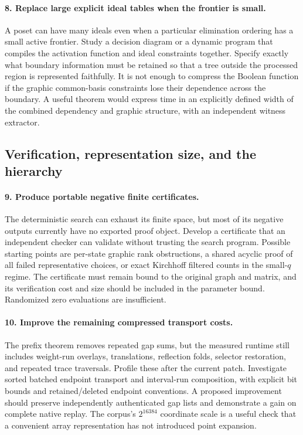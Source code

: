 \paragraph{8. Replace large explicit ideal tables when the frontier is small.}
A poset can have many ideals even when a particular elimination ordering
has a small active frontier.  Study a decision diagram or a dynamic program
that compiles the activation function and ideal constraints together.
Specify exactly what boundary information must be retained so that a tree
outside the processed region is represented faithfully.  It is not enough
to compress the Boolean function if the graphic common-basis constraints
lose their dependence across the boundary.  A useful theorem would express
time in an explicitly defined width of the combined dependency and graphic
structure, with an independent witness extractor.

\subsection{Verification, representation size, and the hierarchy}

\paragraph{9. Produce portable negative finite certificates.}
The deterministic search can exhaust its finite space, but most of its
negative outputs currently have no exported proof object.  Develop a
certificate that an independent checker can validate without trusting the
search program.  Possible starting points are per-state graphic rank
obstructions, a shared acyclic proof of all failed representative choices,
or exact Kirchhoff filtered counts in the small-$q$ regime.  The certificate
must remain bound to the original graph and matrix, and its verification
cost and size should be included in the parameter bound.  Randomized zero
evaluations are insufficient.

\paragraph{10. Improve the remaining compressed transport costs.}
The prefix theorem removes repeated gap sums, but the measured runtime
still includes weight-run overlays, translations, reflection folds,
selector restoration, and repeated trace traversals.  Profile these after
the current patch.  Investigate sorted batched endpoint transport and
interval-run composition, with explicit bit bounds and retained/deleted
endpoint conventions.  A proposed improvement should preserve independently
authenticated gap lists and demonstrate a gain on complete native replay.
The corpus's $2^{16384}$ coordinate scale is a useful check that a convenient
array representation has not introduced point expansion.

